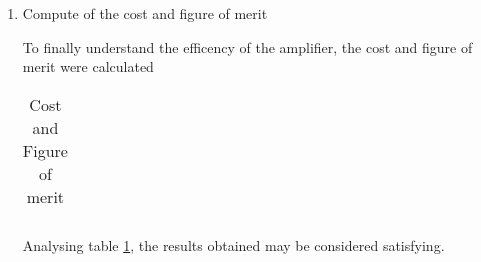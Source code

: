 \begin{enumerate}
\item Compute of the cost and figure of merit
\par To finally understand the efficency of the amplifier, the cost and figure of merit were calculated

\begin{table}[ht]
  \centering
  \begin{tabular}{|l|r|}
    \hline    
    
   \end{tabular}
  \caption{Cost and Figure of merit}
  \label{tab:cost}
\end{table}

Analysing table \ref{tab:cost}, the results obtained may be considered satisfying.


\end{enumerate}


